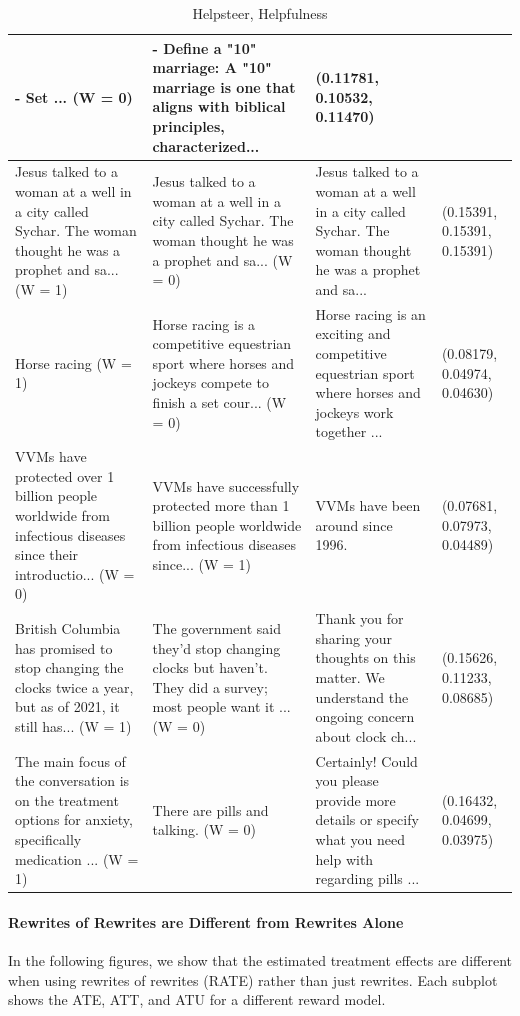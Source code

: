 \documentclass{article}
\begin{document}
\begin{table}[H]
\begin{tabular}{|p{}|p{}|p{}|p{}|}
  - Set ... (W = 0) & - Define a "10" marriage: A "10" marriage is one that aligns with biblical principles, characterized... & (0.11781, 0.10532, 0.11470) \\ \hline
  Jesus talked to a woman at a well in a city called Sychar. The woman thought he was a prophet and sa... (W = 1) & Jesus talked to a woman at a well in a city called Sychar. The woman thought he was a prophet and sa... (W = 0) & Jesus talked to a woman at a well in a city called Sychar. The woman thought he was a prophet and sa... & (0.15391, 0.15391, 0.15391) \\ \hline
  Horse racing (W = 1) & Horse racing is a competitive equestrian sport where horses and jockeys compete to finish a set cour... (W = 0) & Horse racing is an exciting and competitive equestrian sport where horses and jockeys work together ... & (0.08179, 0.04974, 0.04630) \\ \hline
  VVMs have protected over 1 billion people worldwide from infectious diseases since their introductio... (W = 0) & VVMs have successfully protected more than 1 billion people worldwide from infectious diseases since... (W = 1) & VVMs have been around since 1996. & (0.07681, 0.07973, 0.04489) \\ \hline
  British Columbia has promised to stop changing the clocks twice a year, but as of 2021, it still has... (W = 1) & The government said they'd stop changing clocks but haven't. They did a survey; most people want it ... (W = 0) & Thank you for sharing your thoughts on this matter. We understand the ongoing concern about clock ch... & (0.15626, 0.11233, 0.08685) \\ \hline
  The main focus of the conversation is on the treatment options for anxiety, specifically medication ... (W = 1) & There are pills and talking. (W = 0) & Certainly! Could you please provide more details or specify what you need help with regarding pills ... & (0.16432, 0.04699, 0.03975) \\ \hline
  \end{tabular}
  \caption{Helpsteer, Helpfulness}
\end{table}

\newpage
\paragraph{Rewrites of Rewrites are Different from Rewrites Alone}
\label{appendix:rewrites_of_rewrites}
In the following figures, we show that the estimated treatment effects are different when using rewrites of rewrites (RATE) rather than just rewrites. Each subplot shows the ATE, ATT, and ATU for a different reward model.
\end{document}
